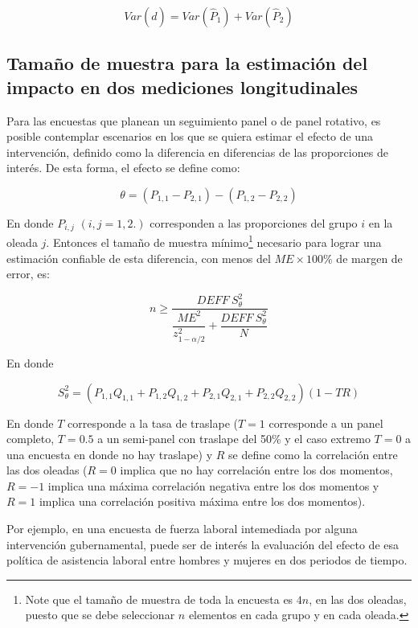 \documentclass[
  12pt,
]{book}
\begin{document}
\[
Var(\hat{d}) 
= Var(\hat{P}_1) + Var(\hat{P}_2)
\]

\hypertarget{tamauxf1o-de-muestra-para-la-estimaciuxf3n-del-impacto-en-dos-mediciones-longitudinales}{%
\subsection{Tamaño de muestra para la estimación del impacto en dos mediciones longitudinales}\label{tamauxf1o-de-muestra-para-la-estimaciuxf3n-del-impacto-en-dos-mediciones-longitudinales}}

Para las encuestas que planean un seguimiento panel o de panel rotativo, es posible contemplar escenarios en los que se quiera estimar el efecto de una intervención, definido como la diferencia en diferencias de las proporciones de interés. De esta forma, el efecto se define como:

\[
\theta = (P_{1,1}-P_{2,1})-(P_{1,2}-P_{2, 2})
\]

En donde \(P_{i,j}\) \((i, j = 1, 2.)\) corresponden a las proporciones del grupo \(i\) en la oleada \(j\). Entonces el tamaño de muestra mínimo\footnote{Note que el tamaño de muestra de toda la encuesta es \(4n\), en las dos oleadas, puesto que se debe seleccionar \(n\) elementos en cada grupo y en cada oleada.} necesario para lograr una estimación confiable de esta diferencia, con menos del \(ME \times 100\%\) de margen de error, es:

\[
n \geq \dfrac{DEFF \ S^2_{\theta}}{\dfrac{ME^2}{z_{1 - \alpha/2}^2}+\dfrac{DEFF \ S^2_{\theta}}{N}}
\]

En donde

\[
S^2_{\theta} = (P_{1,1}Q_{1,1}+P_{1,2}Q_{1,2}+P_{2,1}Q_{2,1}+P_{2,2}Q_{2,2})(1-TR)
\]

En donde \(T\) corresponde a la tasa de traslape (\(T=1\) corresponde a un panel completo, \(T=0.5\) a un semi-panel con traslape del 50\% y el caso extremo \(T=0\) a una encuesta en donde no hay traslape) y \(R\) se define como la correlación entre las dos oleadas (\(R=0\) implica que no hay correlación entre los dos momentos, \(R=-1\) implica una máxima correlación negativa entre los dos momentos y \(R=1\) implica una correlación positiva máxima entre los dos momentos).

Por ejemplo, en una encuesta de fuerza laboral intemediada por alguna intervención gubernamental, puede ser de interés la evaluación del efecto de esa política de asistencia laboral entre hombres y mujeres en dos periodos de tiempo.
\end{document}
